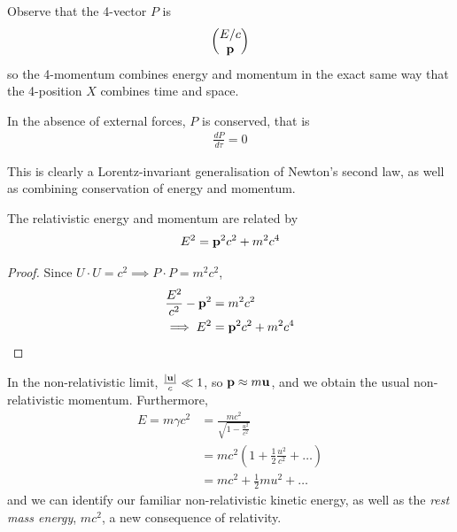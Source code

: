 \documentclass{../template/note}
\begin{document}
    Observe that the 4-vector \(P\) is
    \begin{align*}
        \begin{pmatrix}
            E/c \\
            \V p \\
        \end{pmatrix}
    \end{align*}
    so the 4-momentum combines energy and momentum in the exact same way that the 4-position \(X\) combines time and space.

    \begin{proposition}
        In the absence of external forces, \(P\) is conserved, that is
        \begin{align*}
            \frac{dP}{d\tau} = 0
        \end{align*}
    \end{proposition}
    
    \begin{remark*}
        This is clearly a Lorentz-invariant generalisation of Newton's second law, as well as combining conservation of energy and momentum.
    \end{remark*}
    
    \begin{proposition}
        The relativistic energy and momentum are related by
        \begin{align*}
            E^2 = \V p^2 c^2 + m^2c^4
        \end{align*}
    \end{proposition}
    
    \begin{proof}
        Since \(U \cdot U = c^2 \implies P \cdot P = m^2c^2\),
        \begin{align*}
            \frac{E^2}{c^2} - \V p^2 &= m^2c^2 \\
            \implies E^2 &= \V p^2 c^2 + m^2c^4
        \end{align*}
    \end{proof}
    
    In the non-relativistic limit, \(\frac{|\V u|}{c} \ll 1\), so \(\V p \approx m \V u\), and we obtain the usual non-relativistic momentum. Furthermore,
    \begin{align*}
        E = m \gamma c^2 &= \frac{mc^2}{\sqrt{1-\frac{u^2}{c^2}}} \\
        &= mc^2 \left(1 + \frac 1 2 \frac{u^2}{c^2} + \dots\right) \\
        &= mc^2 + \frac 1 2 mu^2 + \dots
    \end{align*}
    and we can identify our familiar non-relativistic kinetic energy, as well as the \emph{rest mass energy}, \(mc^2\), a new consequence of relativity.
\end{document}
